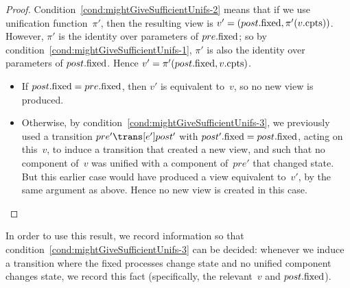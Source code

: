 \begin{proof}
Condition~\ref{cond:mightGiveSufficientUnifs-2}  means that
if we use unification function~$\pi'$, then the resulting view is $v' =
(post.\mathrm{fixed}, \pi'(v.\mathrm{cpts}))$.
%
However, $\pi'$ is the identity over parameters of $pre.\mathrm{fixed}$; so by
condition~\ref{cond:mightGiveSufficientUnifs-1}, $\pi'$ is also the identity
over parameters of $post.\mathrm{fixed}$.  Hence $v' = \pi'(post.\mathrm{fixed}, v.\mathrm{cpts})$.
%
\begin{itemize}
\item If $post.\mathrm{fixed} = pre.\mathrm{fixed}$, then $v'$ is equivalent to~$v$, so no new
  view is produced.

\item Otherwise, by condition~\ref{cond:mightGiveSufficientUnifs-3}, we
  previously used a transition $pre' \trans[e'] post'$ with $post'.\mathrm{fixed} =
  post.\mathrm{fixed}$, acting on this~$v$, to induce a transition that created a new
  view, and such that no component of~$v$ was unified with a component
  of~$pre'$ that changed state.  But this earlier case would have produced a
  view equivalent to~$v'$, by the same argument as above.  Hence no new view
  is created in this case.
\end{itemize}
\end{proof}

In order to use this result, we record information so that
condition~\ref{cond:mightGiveSufficientUnifs-3} can be decided: whenever we
induce a transition where the fixed processes change state and no unified
component changes state, we record this fact (specifically, the relevant~$v$
and $post.\mathrm{fixed}$).

